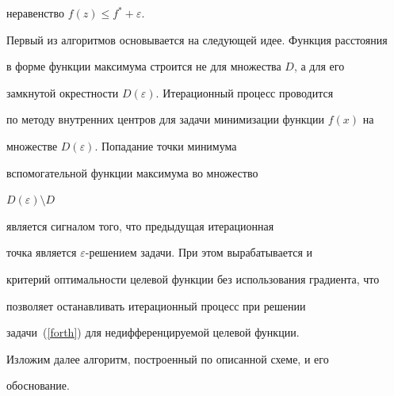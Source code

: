 неравенство $f(z)\le f^*+\varepsilon$.





Первый из алгоритмов основывается на следующей идее. Функция расстояния


в форме функции максимума строится не для множества $D$, а для его


замкнутой окрестности $D(\varepsilon)$. Итерационный процесс проводится


по методу внутренних центров для задачи минимизации функции $f(x)$ на


множестве $D(\varepsilon)$. Попадание точки минимума


вспомогательной функции максимума во множество


$D(\varepsilon)\setminus D$


является сигналом того, что предыдущая итерационная


точка является $\varepsilon$-решением задачи. При этом вырабатывается и


критерий оптимальности целевой функции без использования градиента, что


позволяет останавливать итерационный процесс при решении


задачи~(\ref{forth}) для недифференцируемой целевой функции.





Изложим далее алгоритм, построенный по описанной схеме, и его


обоснование.





